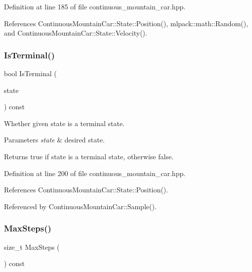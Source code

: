 Definition at line 185 of file continuous\+\_\+mountain\+\_\+car.\+hpp.



References Continuous\+Mountain\+Car\+::\+State\+::\+Position(), mlpack\+::math\+::\+Random(), and Continuous\+Mountain\+Car\+::\+State\+::\+Velocity().

\mbox{\label{classmlpack_1_1rl_1_1ContinuousMountainCar_a7fd056133dfd315e4bf45c408f99326f}} 
\subsubsection{Is\+Terminal()}
{\footnotesize\ttfamily bool Is\+Terminal (\begin{DoxyParamCaption}\item[{const \textbf{ State} \&}]{state }\end{DoxyParamCaption}) const\hspace{0.3cm}{\ttfamily [inline]}}



Whether given state is a terminal state. 


\begin{DoxyParams}{Parameters}
{\em state} & desired state. \\
\hline
\end{DoxyParams}
\begin{DoxyReturn}{Returns}
true if state is a terminal state, otherwise false. 
\end{DoxyReturn}


Definition at line 200 of file continuous\+\_\+mountain\+\_\+car.\+hpp.



References Continuous\+Mountain\+Car\+::\+State\+::\+Position().



Referenced by Continuous\+Mountain\+Car\+::\+Sample().

\mbox{\label{classmlpack_1_1rl_1_1ContinuousMountainCar_ad8fd6d8f7581c82e73556491b79a8907}} 
\subsubsection{Max\+Steps()\hspace{0.1cm}{\footnotesize\ttfamily [1/2]}}
{\footnotesize\ttfamily size\+\_\+t Max\+Steps (\begin{DoxyParamCaption}{ }\end{DoxyParamCaption}) const\hspace{0.3cm}{\ttfamily [inline]}}



